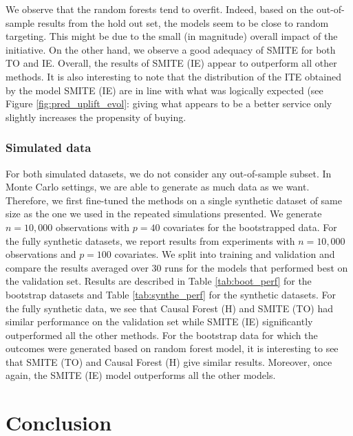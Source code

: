\documentclass{article}
\begin{document}
We observe that the random forests tend to overfit. Indeed, based on the out-of-sample results from the hold out set, the models seem to be close to random targeting. This might be due to the small (in magnitude) overall impact of the initiative. On the other hand, we observe a good adequacy of SMITE for both TO and IE. Overall, the results of SMITE (IE) appear to outperform all other methods. It is also interesting to note that the distribution of the ITE obtained by the model SMITE (IE) are in line with what was logically expected (see Figure \ref{fig:pred_uplift_evol}: giving what appears to be a better service only slightly increases the propensity of buying. 




\subsubsection{Simulated data}\label{synt}

For both simulated datasets, we do not consider any out-of-sample subset. In Monte Carlo settings, we are able to generate as much data as we want. Therefore, we first fine-tuned the methods on a single synthetic dataset of same size as the one we used in the repeated simulations presented. We generate $n=10,000$ observations with $p=40$ covariates for the bootstrapped data. For the fully synthetic datasets, we report results from experiments with $n=10,000$ observations and $p=100$ covariates. We split into training and validation and compare the results averaged over $30$ runs for the models that performed best on the validation set. Results are described in Table \ref{tab:boot_perf} for the bootstrap datasets and Table \ref{tab:synthe_perf} for the synthetic datasets. For the fully synthetic data, we see that Causal Forest (H) and SMITE (TO) had similar performance on the validation set while SMITE (IE) significantly outperformed all the other methods. For the bootstrap data for which the outcomes were generated based on random forest model, it is interesting to see that SMITE (TO) and Causal Forest (H) give similar results. Moreover, once again, the SMITE (IE) model outperforms all the other models.








\section{Conclusion}
\label{discussion}
\end{document}
